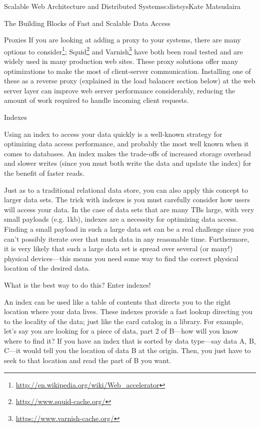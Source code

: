 \begin{aosachapter}{Scalable Web Architecture and Distributed Systems}{s:distsys}{Kate Matsudaira}
\begin{aosasect1}{The Building Blocks of Fast and Scalable Data Access}
\begin{aosasect2}{Proxies}
If you are looking at adding a proxy to your systems, there are many
options to
consider\footnote{\url{http://en.wikipedia.org/wiki/Web_accelerator}};
Squid\footnote{\url{http://www.squid-cache.org/}} and
Varnish\footnote{\url{https://www.varnish-cache.org/}} have both been
road tested and are widely used in many production web sites. These
proxy solutions offer many optimizations to make the most of
client-server communication. Installing one of these as a reverse
proxy (explained in the load balancer section below) at the web server
layer can improve web server performance considerably, reducing the
amount of work required to handle incoming client requests.

\end{aosasect2}

\begin{aosasect2}{Indexes}

Using an index to access your data quickly is a well-known strategy
for optimizing data access performance, and probably the most well
known when it comes to databases. An index makes the trade-offs of
increased storage overhead and slower writes (since you must both
write the data and update the index) for the benefit of faster reads.

Just as to a traditional relational data store, you can also apply
this concept to larger data sets. The trick with indexes is you must
carefully consider how users will access your data. In the case of
data sets that are many TBs large, with very small payloads
(e.g. 1kb), indexes are a necessity for optimizing data
access. Finding a small payload in such a large data set can be a real
challenge since you can't possibly iterate over that much data in any
reasonable time. Furthermore, it is very likely that such a large data
set is spread over several (or many!) physical devices---this means
you need some way to find the correct physical location of the desired
data.

What is the best way to do this? Enter indexes!

An index can be used like a table of contents that directs you to the
right location where your data lives. These indexes provide a fast
lookup directing you to the locality of the data; just like the card
catalog in a library. For example, let's say you are looking for a
piece of data, part 2 of B---how will you know where to find it? If
you have an index that is sorted by data type---say data A, B, C---it
would tell you the location of data B at the origin. Then, you just
have to seek to that location and read the part of B you want.


\end{aosasect2}
\end{aosasect1}
\end{aosachapter}
